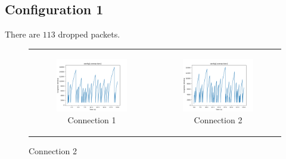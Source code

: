 \documentclass[11pt]{article}
\begin{document}
\subsection{Configuration 1}
There are $113$ dropped packets.
\begin{figure}[H]
  \centering
  \begin{tabular}[c]{cc}
    \begin{subfigure}[c]{0.5\textwidth}
      \centering
      \includegraphics[width=\textwidth]{Q3/outputs/config1connection1.png}
      \caption{Connection 1}
    \end{subfigure}&

    \begin{subfigure}[c]{0.5\textwidth}
      \centering
      \includegraphics[width=\textwidth]{Q3/outputs/config1connection2.png}
      \caption{Connection 2}
    \end{subfigure}\\


\end{tabular}
\end{figure}
\end{document}
